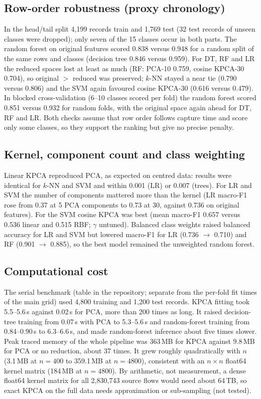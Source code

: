\documentclass[runningheads]{llncs}
\begin{document}
\subsection{Row-order robustness (proxy chronology)}
In the head/tail split 4{,}199 records train and 1{,}769 test (32 test records of unseen classes were dropped); only seven of the 15 classes occur in both parts. The random forest on original features scored 0.838 versus 0.948 for a random split of the same rows and classes (decision tree 0.846 versus 0.959). For DT, RF and LR the reduced spaces lost at least as much (RF: PCA-10 0.759, cosine KPCA-30 0.704), so original $>$ reduced was preserved; $k$-NN stayed a near tie (0.790 versus 0.806) and the SVM again favoured cosine KPCA-30 (0.616 versus 0.479). In blocked cross-validation (6--10 classes scored per fold) the random forest scored 0.851 versus 0.932 for random folds, with the original space again ahead for DT, RF and LR. Both checks assume that row order follows capture time and score only some classes, so they support the ranking but give no precise penalty.





\subsection{Kernel, component count and class weighting}
Linear KPCA reproduced PCA, as expected on centred data: results were identical for $k$-NN and SVM and within 0.001 (LR) or 0.007 (trees). For LR and SVM the number of components mattered more than the kernel (LR macro-F1 rose from 0.37 at 5 PCA components to 0.73 at 30, against 0.736 on original features). For the SVM cosine KPCA was best (mean macro-F1 0.657 versus 0.536 linear and 0.515 RBF; $\gamma$ untuned). Balanced class weights raised balanced accuracy for LR and SVM but lowered macro-F1 for LR (0.736 $\to$ 0.710) and RF (0.901 $\to$ 0.885), so the best model remained the unweighted random forest.

\subsection{Computational cost}
The serial benchmark (table in the repository; separate from the per-fold fit times of the main grid) used 4{,}800 training and 1{,}200 test records. KPCA fitting took 5.5--5.6\,s against 0.02\,s for PCA, more than 200 times as long. It raised decision-tree training from 0.07\,s with PCA to 5.3--5.6\,s and random-forest training from 0.84--0.90\,s to 6.3--6.6\,s, and made random-forest inference about five times slower. Peak traced memory of the whole pipeline was 363\,MB for KPCA against 9.8\,MB for PCA or no reduction, about 37 times. It grew roughly quadratically with $n$ (3.1\,MB at $n=400$ to 359.1\,MB at $n=4800$), consistent with an $n\times n$ float64 kernel matrix (184\,MB at $n=4800$). By arithmetic, not measurement, a dense float64 kernel matrix for all 2{,}830{,}743 source flows would need about 64\,TB, so exact KPCA on the full data needs approximation or sub-sampling (not tested).
\end{document}

